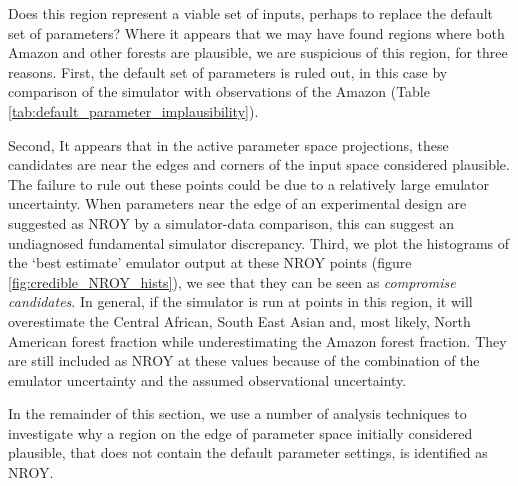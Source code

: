 \documentclass[esd, manuscript]{copernicus}
\begin{document}

Does this region represent a viable set of inputs, perhaps to replace the default set of parameters? Where it appears that we may have found regions where both Amazon and other forests are plausible, we are suspicious of this region, for three reasons. First, the default set of parameters is ruled out, in this case by comparison of the simulator with observations of the Amazon (Table \ref{tab:default_parameter_implausibility}).

%

Second, It appears that in the active parameter space projections, these candidates are near the edges and corners of the input space considered plausible. The failure to rule out these points could be due to a relatively large emulator uncertainty. When parameters near the edge of an experimental design are suggested as NROY by a simulator-data comparison, this can suggest an undiagnosed fundamental simulator discrepancy. Third, we plot the histograms of the `best estimate' emulator output at these NROY points (figure \ref{fig:credible_NROY_hists}), we see that they can be seen as \emph{compromise candidates}. In general, if the simulator is run at points in this region, it will overestimate the Central African, South East Asian and, most likely, North American forest fraction while underestimating the Amazon forest fraction. They are still included as NROY at these values because of the combination of the emulator uncertainty and the assumed observational uncertainty.


In the remainder of this section, we use a number of analysis techniques to investigate why a region on the edge of parameter space initially considered plausible, that does not contain the default parameter settings, is identified as NROY.
\end{document}
